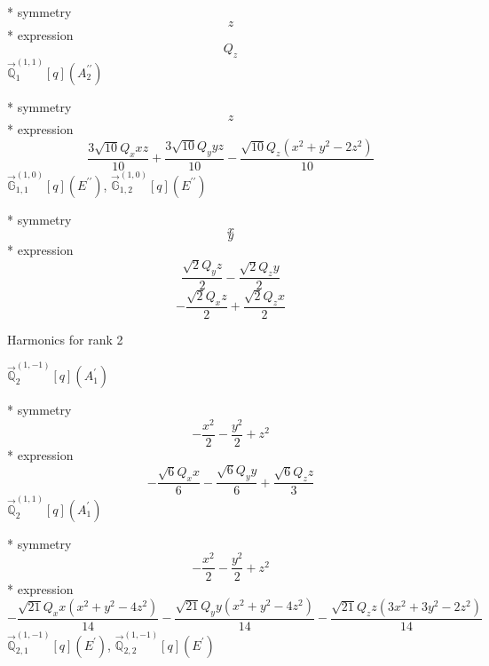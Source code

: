 \documentclass[fleqn,8pt]{jsarticle}
\begin{document}
\noindent\quad ** symmetry
\begin{dmath*}
z
\end{dmath*}
\noindent\quad ** expression
\begin{dmath*}
Q_{z}
\end{dmath*}
\noindent\quad $\vec{\mathbb{Q}}_{1}^{(1,1)}[q](A_{2}^{\prime\prime})$

\noindent\quad ** symmetry
\begin{dmath*}
z
\end{dmath*}
\noindent\quad ** expression
\begin{dmath*}
\frac{3 \sqrt{10} Q_{x} x z}{10} + \frac{3 \sqrt{10} Q_{y} y z}{10} - \frac{\sqrt{10} Q_{z} \left(x^{2} + y^{2} - 2 z^{2}\right)}{10}
\end{dmath*}
\noindent\quad $\vec{\mathbb{G}}_{1,1}^{(1,0)}[q](E^{\prime\prime})$, $\vec{\mathbb{G}}_{1,2}^{(1,0)}[q](E^{\prime\prime})$

\noindent\quad ** symmetry
\begin{dmath*}
x
\end{dmath*}
\begin{dmath*}
y
\end{dmath*}
\noindent\quad ** expression
\begin{dmath*}
\frac{\sqrt{2} Q_{y} z}{2} - \frac{\sqrt{2} Q_{z} y}{2}
\end{dmath*}
\begin{dmath*}
- \frac{\sqrt{2} Q_{x} z}{2} + \frac{\sqrt{2} Q_{z} x}{2}
\end{dmath*}

\noindent * Harmonics for rank 2

\noindent\quad $\vec{\mathbb{Q}}_{2}^{(1,-1)}[q](A_{1}^{\prime})$

\noindent\quad ** symmetry
\begin{dmath*}
- \frac{x^{2}}{2} - \frac{y^{2}}{2} + z^{2}
\end{dmath*}
\noindent\quad ** expression
\begin{dmath*}
- \frac{\sqrt{6} Q_{x} x}{6} - \frac{\sqrt{6} Q_{y} y}{6} + \frac{\sqrt{6} Q_{z} z}{3}
\end{dmath*}
\noindent\quad $\vec{\mathbb{Q}}_{2}^{(1,1)}[q](A_{1}^{\prime})$

\noindent\quad ** symmetry
\begin{dmath*}
- \frac{x^{2}}{2} - \frac{y^{2}}{2} + z^{2}
\end{dmath*}
\noindent\quad ** expression
\begin{dmath*}
- \frac{\sqrt{21} Q_{x} x \left(x^{2} + y^{2} - 4 z^{2}\right)}{14} - \frac{\sqrt{21} Q_{y} y \left(x^{2} + y^{2} - 4 z^{2}\right)}{14} - \frac{\sqrt{21} Q_{z} z \left(3 x^{2} + 3 y^{2} - 2 z^{2}\right)}{14}
\end{dmath*}
\noindent\quad $\vec{\mathbb{Q}}_{2,1}^{(1,-1)}[q](E^{\prime})$, $\vec{\mathbb{Q}}_{2,2}^{(1,-1)}[q](E^{\prime})$
\end{document}
